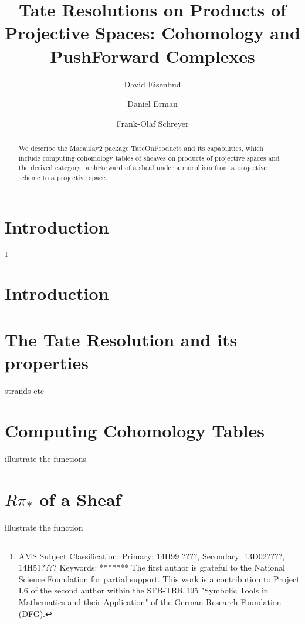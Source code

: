 \documentclass[twoside,12pt, leqno]{amsart}
\author[David Eisenbud]{David Eisenbud}
\author{Daniel Erman}
\author[Frank-Olaf Schreyer]{Frank-Olaf Schreyer}
\title{Tate Resolutions on Products of Projective Spaces: Cohomology and PushForward Complexes}
\begin{document}
\begin{abstract}
We describe the  Macaulay2 package TateOnProducts and its capabilities, which include computing cohomology tables of sheaves
on products of projective spaces and the derived category pushForward of a sheaf under a morphism from a projective scheme to
a projective space.
\end{abstract}

\maketitle

\section*{Introduction} 
\let\thefootnote\relax\footnote{
\noindent AMS Subject Classification:
Primary: 14H99 ????,
Secondary: 13D02????, 14H51???? \smallbreak
Keywords: *******\smallbreak
The first author is grateful to the
National Science Foundation for partial support. This work is a contribution to Project I.6 of the second author within the SFB-TRR 195 "Symbolic Tools in Mathematics and their Application" of the German Research Foundation (DFG).}


\section*{Introduction}

\section{The Tate Resolution and its properties}

strands etc

\section{Computing Cohomology Tables}

illustrate the functions

\section{ $R\pi_*$ of a Sheaf}

illustrate the function
\end{document}
